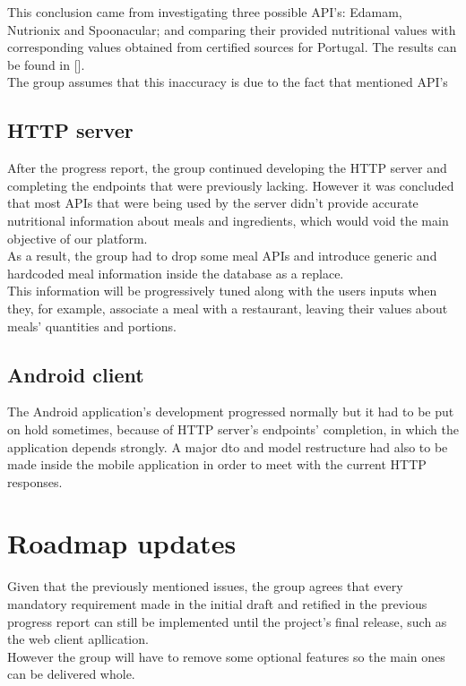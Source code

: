     This conclusion came from investigating three possible API's: Edamam, Nutrionix and Spoonacular; and comparing
    their provided nutritional values with corresponding values obtained from
    certified sources for Portugal. The results can be found in [].\\

    The group assumes that this inaccuracy is due to the fact that
    mentioned API's\\ 
    \subsection{HTTP server}

    After the progress report, the group continued developing the HTTP server and completing the endpoints that were previously lacking. However
    it was concluded that most APIs that were being used by the server didn't provide accurate nutritional information about meals and ingredients,
    which would void the main objective of our platform.\\

    As a result, the group had to drop some meal APIs and introduce generic and hardcoded meal information inside the database as a replace.\\

    This information will be progressively tuned along with the users inputs when they, for example, associate a meal with a restaurant, leaving
    their values about meals' quantities and portions.

    \subsection{Android client}

    The Android application's development progressed normally but it had to be put on hold sometimes, because of HTTP server's endpoints' completion, in which the application
    depends strongly. A major dto and model restructure had also to be made inside the mobile application in order to meet with the current HTTP responses.\\

    \section{Roadmap updates}

    Given that the previously mentioned issues, the group agrees that every mandatory requirement made in the initial draft
    and retified in the previous progress report can still be implemented until the project's final release, such as the web client apllication.\\
    
    However the group will have to remove some optional features so the main ones can be delivered whole.
